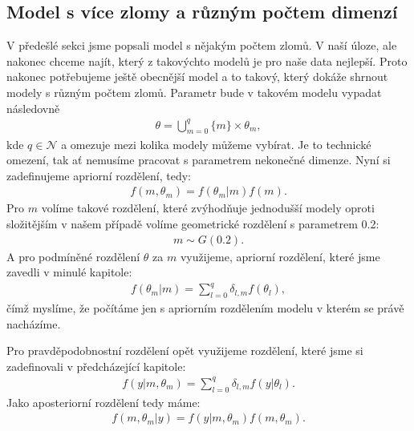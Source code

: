 \documentclass[czech,master,public,dept470,male,cpdeclaration,oneside, python]{diploma}
\begin{document}
\subsection{Model s více zlomy a různým počtem dimenzí}
V předešlé sekci jsme popsali model s nějakým počtem zlomů. V naší úloze, ale nakonec chceme najít, který z takovýchto modelů je pro naše data nejlepší. Proto nakonec potřebujeme ještě obecnější model a to takový, který dokáže shrnout modely s různým počtem zlomů. Parametr bude v takovém modelu vypadat následovně 
\begin{align}
\theta = \bigcup_{m=0}^q\{m\} \times \theta_m,
\end{align}
kde $q \in \mathcal{N}$ a omezuje mezi kolika modely můžeme vybírat. Je to technické omezení, tak ať nemusíme pracovat s parametrem nekonečné dimenze. Nyní si zadefinujeme apriorní rozdělení, tedy:
\begin{align}
f(m, \theta_m) = f(\theta_m | m)f(m).
\end{align}
Pro $m$ volíme takové rozdělení, které zvýhodňuje jednodušší modely oproti složitějším v našem případě volíme geometrické rozdělení s parametrem 0.2:
\begin{align}
m \sim G(0.2).
\end{align}
A pro podmíněné rozdělení $\theta$ za $m$ využijeme, apriorní rozdělení, které jsme zavedli v minulé kapitole:
\begin{align}
f(\theta_m | m) = \sum_{l=0}^q \delta_{l, m} f(\theta_l),
\end{align}
čímž myslíme, že počítáme jen s apriorním rozdělením modelu v kterém se právě nacházíme. \par 
Pro pravděpodobnostní rozdělení opět využijeme rozdělení, které jsme si zadefinovali v předcházející kapitole:
\begin{align}
f(y | m, \theta_m) = \sum_{l=0}^q \delta_{l,m} f(y | \theta_l).
\end{align}
Jako aposteriorní rozdělení tedy máme:
\begin{align}\label{supermodel}
	f(m, \theta_m | y) = f(y | m, \theta_m)f(m, \theta_m).
\end{align}
\end{document}
